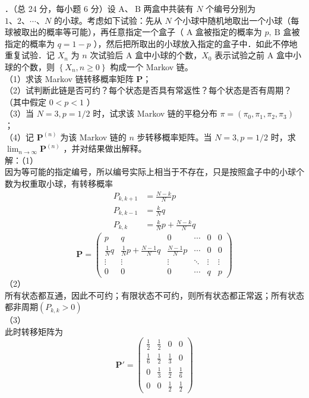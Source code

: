 \documentclass[UTF8]{ctexart}
\begin{document}
．（总 24 分，每小题 6 分）设 $\mathrm{A} 、 \mathrm{~B}$ 两盒中共装有 $N$ 个编号分别为 $1 、 2 、 \cdots 、 N$ 的小球。考虑如下试验：先从 $N$ 个小球中随机地取出一个小球（每球被取出的概率等可能），再任意指定一个盒子（ A 盒被指定的概率为 $p, \mathrm{~B}$ 盒被指定的概率为 $q=1-p$ ），然后把所取出的小球放入指定的盒子中．如此不停地重复试验．记 $X_{n}$ 为 $n$ 次试验后 A 盒中小球的个数，$X_{0}$ 表示试验之前 A 盒中小球的个数，则 $\left\{X_{n}, n \geq 0\right\}$ 构成一个 Markov 链。\\
（1）求该 Markov 链转移概率矩阵 $\mathbf{P}$；\\
（2）试判断此链是否可约？每个状态是否具有常返性？每个状态是否有周期？（其中假定 $0<p<1$ ）\\
（3）当 $N=3, p=1 / 2$ 时，试求该 Markov 链的平稳分布 $\pi=\left(\pi_{0}, \pi_{1}, \pi_{2}, \pi_{3}\right)$ ；\\
（4）记 $\mathbf{P}^{(n)}$ 为该 Markov 链的 $n$ 步转移概率矩阵。当 $N=3, p=1 / 2$ 时，求 $\lim _{n \rightarrow \infty} \mathbf{P}^{(n)}$ ，并对结果做出解释。\\
解：（1）\\
因为等可能的指定编号，所以编号实际上相当于不存在，只是按照盒子中的小球个数为权重取小球，有转移概率\\
\[
\begin{aligned}
	P_{k,k+1}&=\frac{N-k}{N}p \\
	P_{k,k-1}&=\frac{k}{N}q \\
	P_{k,k}&=\frac{k}{N}p+\frac{N-k}{N}q
\end{aligned}
\]
\[
\mathbf{P}=
\begin{pmatrix}
	p & q & 0 & \cdots & 0 & 0 \\
	 \frac{1}{N}q & \frac{1}{N}p + \frac{N-1}{N}q & \frac{N-1}{N}p & \cdots & 0 & 0 \\
	\vdots & \vdots & \vdots & \ddots & \vdots & \vdots \\
	0 & 0 & 0 & \cdots & q & p
\end{pmatrix}
\]
（2）\\
所有状态都互通，因此不可约；有限状态不可约，则所有状态都正常返；所有状态都非周期$(P_{k,k}>0)$\\
（3）\\
此时转移矩阵为\\
\[
\mathbf{P'}=
\begin{pmatrix}
	\frac{1}{2}  &\frac{1}{2}&0&0\\
	\frac{1}{6} & \frac{1}{2} &\frac{1}{3} &0\\
	0&\frac{1}{3} &\frac{1}{2}&\frac{1}{6}\\
	0&0&\frac{1}{2}&\frac{1}{2}
\end{pmatrix}
\]
\end{document}
